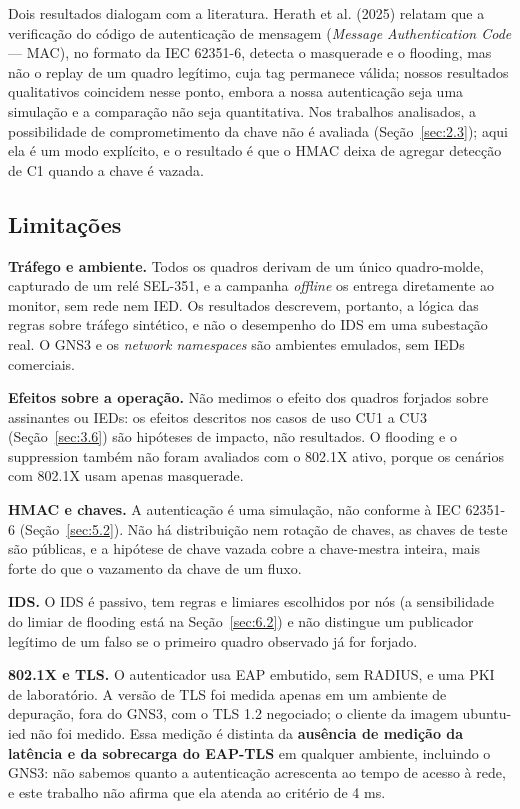 \documentclass[12pt]{article}
\newcommand{\citn}[2]{#1\nocite{#2}}
\begin{document}
Dois resultados dialogam com a literatura. \citn{Herath et al. (2025)}{herath2025evaluation} relatam que a verificação do código de autenticação de mensagem (\emph{Message Authentication Code} — MAC), no formato da IEC 62351-6, detecta o masquerade e o flooding, mas não o replay de um quadro legítimo, cuja tag permanece válida; nossos resultados qualitativos coincidem nesse ponto, embora a nossa autenticação seja uma simulação e a comparação não seja quantitativa. Nos trabalhos analisados, a possibilidade de comprometimento da chave não é avaliada (Seção~\ref{sec:2.3}); aqui ela é um modo explícito, e o resultado é que o HMAC deixa de agregar detecção de C1 quando a chave é vazada.

\subsection{Limitações}\label{sec:7.2}

\textbf{Tráfego e ambiente.} Todos os quadros derivam de um único quadro-molde, capturado de um relé SEL-351, e a campanha \emph{offline} os entrega diretamente ao monitor, sem rede nem IED. Os resultados descrevem, portanto, a lógica das regras sobre tráfego sintético, e não o desempenho do IDS em uma subestação real. O GNS3 e os \emph{network namespaces} são ambientes emulados, sem IEDs comerciais.

\textbf{Efeitos sobre a operação.} Não medimos o efeito dos quadros forjados sobre assinantes ou IEDs: os efeitos descritos nos casos de uso CU1 a CU3 (Seção~\ref{sec:3.6}) são hipóteses de impacto, não resultados. O flooding e o suppression também não foram avaliados com o 802.1X ativo, porque os cenários com 802.1X usam apenas masquerade.

\textbf{HMAC e chaves.} A autenticação é uma simulação, não conforme à IEC 62351-6 (Seção~\ref{sec:5.2}). Não há distribuição nem rotação de chaves, as chaves de teste são públicas, e a hipótese de chave vazada cobre a chave-mestra inteira, mais forte do que o vazamento da chave de um fluxo.

\textbf{IDS.} O IDS é passivo, tem regras e limiares escolhidos por nós (a sensibilidade do limiar de flooding está na Seção~\ref{sec:6.2}) e não distingue um publicador legítimo de um falso se o primeiro quadro observado já for forjado.

\textbf{802.1X e TLS.} O autenticador usa EAP embutido, sem RADIUS, e uma PKI de laboratório. A versão de TLS foi medida apenas em um ambiente de depuração, fora do GNS3, com o TLS 1.2 negociado; o cliente da imagem ubuntu-ied não foi medido. Essa medição é distinta da \textbf{ausência de medição da latência e da sobrecarga do EAP-TLS} em qualquer ambiente, incluindo o GNS3: não sabemos quanto a autenticação acrescenta ao tempo de acesso à rede, e este trabalho não afirma que ela atenda ao critério de 4 ms.
\end{document}

